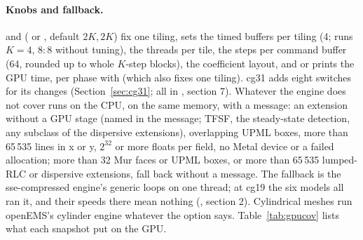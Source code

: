 \paragraph{Knobs and fallback.}  and  ( or ,
default $2K,2K$) fix one tiling,  sets the timed buffers per tiling (4;  runs
$K=4$, $8{:}8$ without tuning),  the threads per tile,  the
steps per command buffer (64, rounded up to whole $K$-step blocks),  the
coefficient layout, and
 or  prints the GPU time, per phase with  (which also fixes one
tiling). cg31 adds eight switches for its changes (Section~\ref{sec:cg31}; all in , section 7).
Whatever the engine does not
cover runs on the CPU, on the same memory, with a message: an extension without a GPU stage (named in the message;
TFSF, the steady-state detection, any subclass of the dispersive extensions), overlapping UPML boxes, more than
65\,535 lines in x or y, $2^{32}$ or more floats per field, no Metal device or a failed allocation; more than 32 Mur
faces or UPML boxes, or more than 65\,535 lumped-RLC or dispersive extensions, fall back without a message. The
fallback is the sse-compressed engine's generic loops on one thread; at cg19 the six models all ran it, and their speeds there
mean nothing (, section 2). Cylindrical meshes run openEMS's
cylinder engine whatever the option says. Table~\ref{tab:gpucov} lists what each snapshot put on the GPU.

